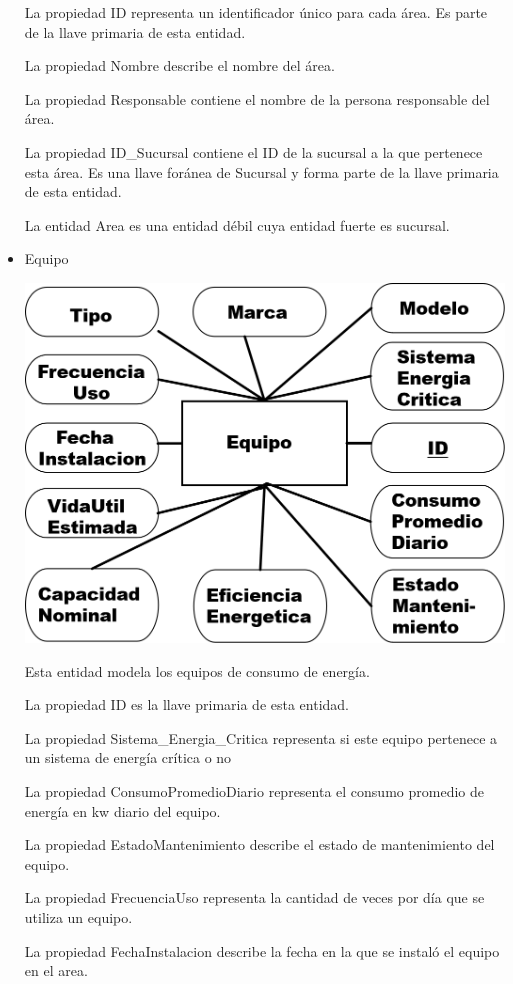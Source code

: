 \documentclass{article}
\begin{document}
\begin{itemize}
La propiedad ID representa un identificador único para cada área. Es parte de la llave primaria de esta entidad.

La propiedad Nombre describe el nombre del área.

La propiedad Responsable contiene el nombre de la persona responsable del área.

La propiedad ID\_Sucursal contiene el ID de la sucursal a la que pertenece esta área. Es una llave foránea  de Sucursal y forma parte de la llave primaria de esta entidad.

La entidad Area es una entidad débil cuya entidad fuerte es sucursal.
\item Equipo

\includegraphics[scale=0.5]{Imagenes/Informe1/EntidadEquipo.png}

Esta entidad modela los equipos de consumo de energía.

La propiedad ID es la llave primaria de esta entidad.

La propiedad Sistema\_Energia\_Critica representa si este equipo pertenece a un sistema de energía crítica o no

La propiedad ConsumoPromedioDiario representa el consumo promedio de energía en kw diario del equipo.

La propiedad EstadoMantenimiento describe el estado de mantenimiento del equipo.

La propiedad FrecuenciaUso representa la cantidad de veces por día que se utiliza un equipo.

La propiedad FechaInstalacion describe la fecha en la que se instaló el equipo en el area.


\end{itemize}
\end{document}
